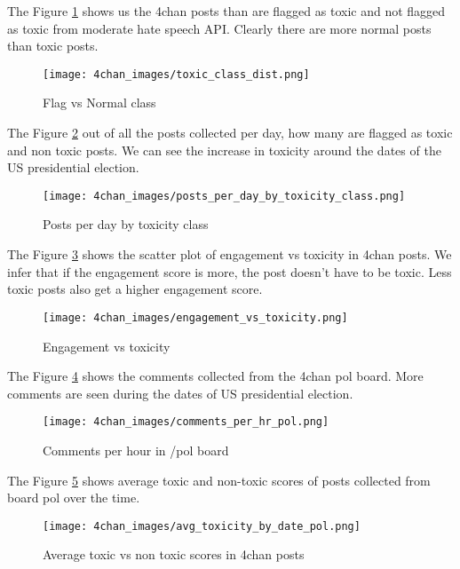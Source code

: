 \documentclass[sigconf]{acmart}
\begin{document}
The Figure \ref{fig:4chan_images/toxic_class_dist} shows us the 4chan posts than are flagged as toxic and not flagged as toxic from moderate hate speech API. Clearly there are more normal posts than toxic posts.\newline
\begin{figure}[h]
    \centering
    \texttt{[image: 4chan\_images/toxic\_class\_dist.png]} %
    \caption{Flag vs Normal class}
    \label{fig:4chan_images/toxic_class_dist}
\end{figure}

The Figure \ref{fig:4chan_images/posts_per_day_by_toxicity_class} out of all the posts collected per day, how many are flagged as toxic and non toxic posts. We can see the increase in toxicity around the dates of the US presidential election.\newline
\begin{figure}[h]
    \centering
    \texttt{[image: 4chan\_images/posts\_per\_day\_by\_toxicity\_class.png]} %
    \caption{Posts per day by toxicity class}
    \label{fig:4chan_images/posts_per_day_by_toxicity_class}
\end{figure}


The Figure \ref{fig:4chan_images/engagement_vs_toxicity} shows the scatter plot of engagement vs toxicity in 4chan posts. We infer that if the engagement score is more, the post doesn't have to be toxic. Less toxic posts also get a higher engagement score.\newline
\begin{figure}[h]
    \centering
    \texttt{[image: 4chan\_images/engagement\_vs\_toxicity.png]} %
    \caption{Engagement vs toxicity}
    \label{fig:4chan_images/engagement_vs_toxicity}
\end{figure}


The Figure \ref{fig:4chan_images/comments_per_hr_pol} shows the comments collected from the 4chan pol board. More comments are seen during the dates of US presidential election.\newline
\begin{figure}[h]
    \centering
    \texttt{[image: 4chan\_images/comments\_per\_hr\_pol.png]} %
    \caption{Comments per hour in /pol board}
    \label{fig:4chan_images/comments_per_hr_pol}
\end{figure}

The Figure \ref{fig:4chan_images/avg_toxicity_by_date_pol} shows average toxic and non-toxic scores of posts collected from board pol over the time. \newline
\begin{figure}[h]
    \centering
    \texttt{[image: 4chan\_images/avg\_toxicity\_by\_date\_pol.png]} %
    \caption{Average toxic vs non toxic scores in 4chan posts}
    \label{fig:4chan_images/avg_toxicity_by_date_pol}
\end{figure}
\end{document}
